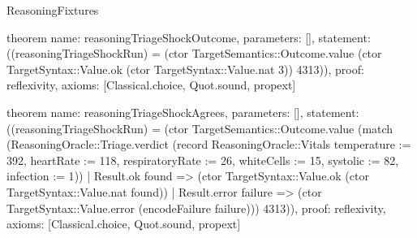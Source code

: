 \begin{lexlean}{ReasoningFixtures}
\begin{semanticmodule}
theorem{
  name: reasoningTriageShockOutcome,
  parameters: [],
  statement: ((reasoningTriageShockRun) = (ctor TargetSemantics::Outcome.value (ctor TargetSyntax::Value.ok (ctor TargetSyntax::Value.nat 3)) 4313)),
  proof: reflexivity{},
  axioms: [Classical.choice, Quot.sound, propext]
}

theorem{
  name: reasoningTriageShockAgrees,
  parameters: [],
  statement: ((reasoningTriageShockRun) = (ctor TargetSemantics::Outcome.value (match (ReasoningOracle::Triage.verdict (record ReasoningOracle::Vitals {temperature := 392, heartRate := 118, respiratoryRate := 26, whiteCells := 15, systolic := 82, infection := 1}))
    | Result.ok found => (ctor TargetSyntax::Value.ok (ctor TargetSyntax::Value.nat found))
    | Result.error failure => (ctor TargetSyntax::Value.error (encodeFailure failure))) 4313)),
  proof: reflexivity{},
  axioms: [Classical.choice, Quot.sound, propext]
}


\end{semanticmodule}
\end{lexlean}
